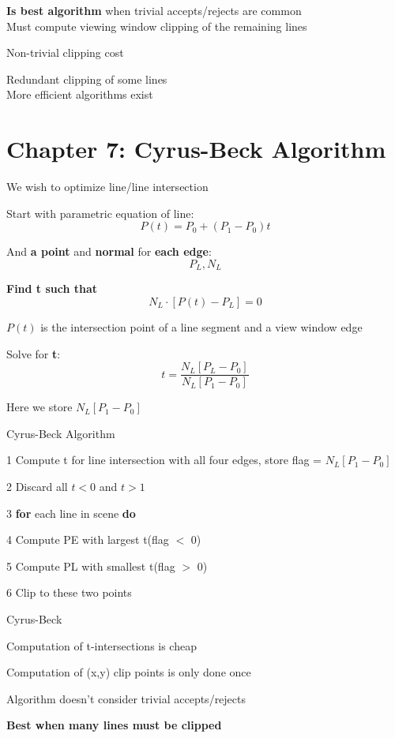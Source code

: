 \documentclass[]{report}
\begin{document}
\textbf{Is best algorithm} when trivial accepts/rejects are common\\
Must compute viewing window clipping of the remaining lines

Non-trivial clipping cost

Redundant clipping of some lines\\
More efficient algorithms exist
\\


\section*{Chapter 7: Cyrus-Beck Algorithm}
We wish to optimize line/line intersection

Start with parametric equation of line:
$$P(t) = P_0 + (P_1 - P_0)t$$

And \textbf{a point} and \textbf{normal} for \textbf{each edge}:
$$P_L, N_L$$

\textbf{Find t such that}
$$N_L \cdot [P(t) - P_L] = 0$$

$P(t)$ is the intersection point of a line segment and a view window edge

Solve for \textbf{t}:
$$t = \frac{N_L[P_L - P_0]}{N_L[P_1 - P_0]}$$

Here we store $N_L[P_1 - P_0]$

\begin{algorithm}[h]
	\caption{Cyrus-Beck Algorithm}
	\begin{algorithmic}[1]
		\item[1] Compute t for line intersection with all four edges, store flag = $N_L[P_1 - P_0]$
		\item[2] Discard all $t < 0$ and $t > 1$
		\item[3] \textbf{for} each line in scene \textbf{do}
		\item[4] Compute PE with largest t(flag $<$ 0)
		\item[5] Compute PL with smallest t(flag $>$ 0)
		\item[6] Clip to these two points
	\end{algorithmic}
\end{algorithm}
Cyrus-Beck

Computation of t-intersections is cheap

Computation of (x,y) clip points is only done once

Algorithm doesn’t consider trivial accepts/rejects

\textbf{Best when many lines must be clipped}
\end{document}
